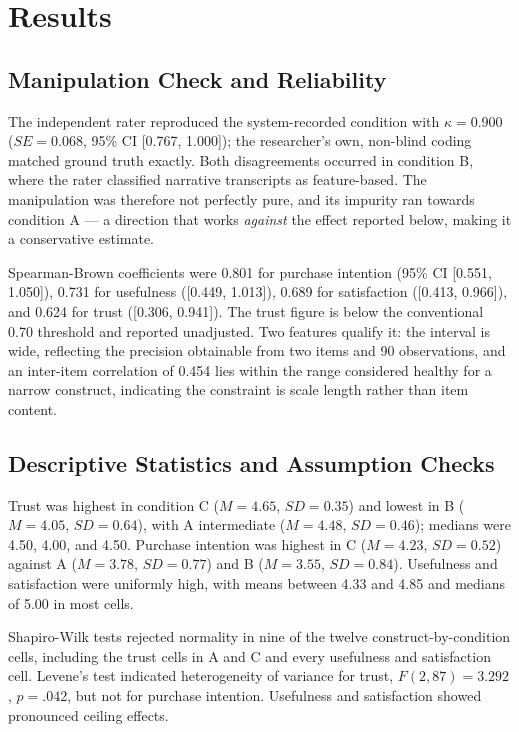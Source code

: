 \documentclass[conference]{IEEEtran}
\begin{document}
\section{Results}
\label{sec:results}

\subsection{Manipulation Check and Reliability}

The independent rater reproduced the system-recorded condition with $\kappa = 0.900$
($SE = 0.068$, 95\% CI [0.767, 1.000]); the researcher's own, non-blind coding matched
ground truth exactly. Both disagreements occurred in condition B, where the rater
classified narrative transcripts as feature-based. The manipulation was therefore not
perfectly pure, and its impurity ran towards condition A --- a direction that works
\textit{against} the effect reported below, making it a conservative estimate.

Spearman-Brown coefficients were 0.801 for purchase intention (95\% CI [0.551, 1.050]),
0.731 for usefulness ([0.449, 1.013]), 0.689 for satisfaction ([0.413, 0.966]), and 0.624
for trust ([0.306, 0.941]). The trust figure is below the conventional 0.70 threshold and
reported unadjusted. Two features qualify it: the interval is wide, reflecting the
precision obtainable from two items and 90 observations, and an inter-item correlation of
0.454 lies within the range considered healthy for a narrow construct, indicating the
constraint is scale length rather than item content.

\subsection{Descriptive Statistics and Assumption Checks}

Trust was highest in condition C ($M = 4.65$, $SD = 0.35$) and lowest in B ($M = 4.05$,
$SD = 0.64$), with A intermediate ($M = 4.48$, $SD = 0.46$); medians were 4.50, 4.00, and
4.50. Purchase intention was highest in C ($M = 4.23$, $SD = 0.52$) against A
($M = 3.78$, $SD = 0.77$) and B ($M = 3.55$, $SD = 0.84$). Usefulness and satisfaction were
uniformly high, with means between 4.33 and 4.85 and medians of 5.00 in most cells.

Shapiro-Wilk tests rejected normality in nine of the twelve construct-by-condition cells,
including the trust cells in A and C and every usefulness and satisfaction cell. Levene's
test indicated heterogeneity of variance for trust, $F(2, 87) = 3.292$, $p = .042$, but not
for purchase intention. Usefulness and satisfaction showed pronounced ceiling effects.
\end{document}
